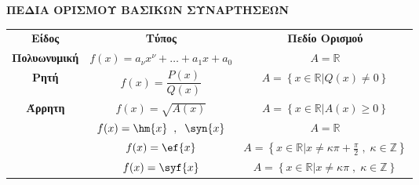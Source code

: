 \documentclass[twoside,nofonts,internet,math,spyros]{frontisthrio}
\begin{document}
 \begin{center}
 \textbf{ΠΕΔΙΑ ΟΡΙΣΜΟΥ ΒΑΣΙΚΩΝ ΣΥΝΑΡΤΗΣΕΩΝ}
\begin{longtable}{ccc}
\hline \rule[-2ex]{0pt}{5.5ex}\textbf{Είδος} & \textbf{Τύπος} & \textbf{Πεδίο Ορισμού} \\ 
\hhline{===} \rule[-2ex]{0pt}{5.5ex} \textbf{Πολυωνυμική} & $ f(x)=a_\nu x^\nu+\ldots+a_1x+a_0 $ & $ A=\mathbb{R} $ \\
\rule[-2ex]{0pt}{5.5ex} \textbf{Ρητή} & $ f(x)=\dfrac{P(x)}{Q(x)} $ & $ A=\left\lbrace\left.  x\in\mathbb{R}\right| Q(x)\neq0\right\rbrace $  \\
\rule[-2ex]{0pt}{5.5ex} \textbf{Άρρητη} & $ f(x)=\sqrt{A(x)} $ & $ A=\left\lbrace\left. x\in\mathbb{R}\right| A(x)\geq0\right\rbrace $ \\
\hhline{~--}\rule[-2ex]{0pt}{5.5ex} \multirow{5}{*}{\textbf{Τριγωνομετρική}} & $ f(x)=\hm{x}\;\;,\;\;\syn{x} $ & $ A=\mathbb{R} $ \\ 
\rule[-2ex]{0pt}{5.5ex}  & $ f(x)=\ef{x} $ & $ A=\left\lbrace\left.x\in\mathbb{R}\right| x\neq\kappa\pi+\frac{\pi}{2}\;,\;\kappa\in\mathbb{Z}\right\rbrace $ \\ 
\rule[-2ex]{0pt}{5.5ex}  & $ f(x)=\syf{x} $ & $ A=\left\lbrace\left.x\in\mathbb{R}\right| x\neq\kappa\pi\;,\;\kappa\in\mathbb{Z}\right\rbrace $ \\ 
\hline 
\end{longtable}
\end{center}
\newpage
\end{document}
